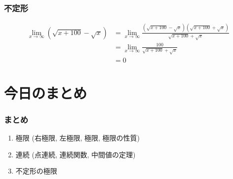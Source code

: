 \begin{frame}
\frametitle{不定形} 


\begin{align*}
\lim_{x\to \infty} (\sqrt{x+100}-\sqrt{x})
& =  \lim_{x\to \infty} \frac{(\sqrt{x+100}-\sqrt{x})(\sqrt{x+100}+\sqrt{x})}{\sqrt{x+100}+\sqrt{x}} \\
& =  \lim_{x\to \infty} \frac{100}{ \sqrt{x+100}+\sqrt{x}} \\
& =0
\end{align*}


\end{frame}










\section{今日のまとめ}
\begin{frame}
\frametitle{まとめ}   


\begin{enumerate}
\item 極限 (右極限, 左極限, 極限, 極限の性質)
\item 連続 (点連続, 連続関数, 中間値の定理)
\item 不定形の極限
\end{enumerate} 


\end{frame}
